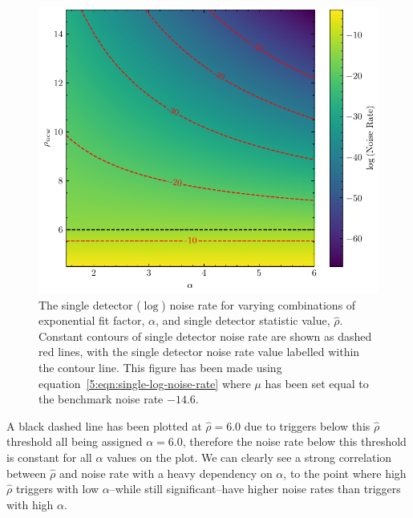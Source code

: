 %
\begin{figure}
    \centering
    \includegraphics[width=1\textwidth]{images/5_pycbclive/high-noise-rate/lognoise_alpha_snr.pdf}
    \caption{The single detector ($\log$) noise rate for varying combinations of exponential fit factor, $\alpha$, and single detector statistic value, $\hat{\rho}$. Constant contours of single detector noise rate are shown as dashed red lines, with the single detector noise rate value labelled within the contour line. This figure has been made using equation~\ref{5:eqn:single-log-noise-rate} where $\mu$ has been set equal to the benchmark noise rate $-14.6$.}
    \label{5:fig:log-noise-static-rate}
\end{figure}
%
A black dashed line has been plotted at $\hat{\rho} = 6.0$ due to triggers below this $\hat{\rho}$ threshold all being assigned $\alpha = 6.0$, therefore the noise rate below this threshold is constant for all $\alpha$ values on the plot. We can clearly see a strong correlation between $\hat{\rho}$ and noise rate with a heavy dependency on $\alpha$, to the point where high $\hat{\rho}$ triggers with low $\alpha$--while still significant--have higher noise rates than triggers with high $\alpha$.



